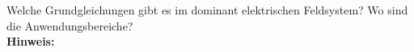 \begin{question}[section=3,subsection=31,name={Dominant Elektrisch},difficulty=7,type=mdl,tags={}]
	Welche Grundgleichungen gibt es im dominant elektrischen Feldsystem? Wo sind die Anwendungsbereiche?
	\\ \textbf{Hinweis:}\\
	
\end{question}
\begin{solution}
	
\end{solution}
